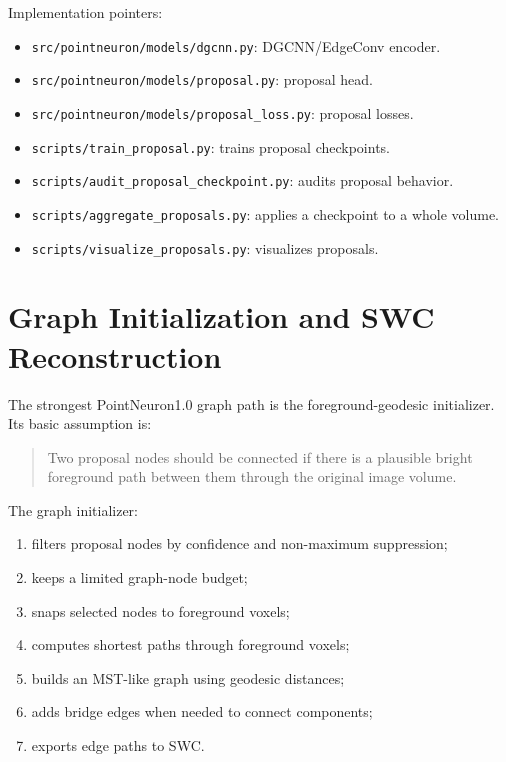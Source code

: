 \documentclass[11pt]{article}
\begin{document}
Implementation pointers:

\begin{itemize}
  \item \texttt{src/pointneuron/models/dgcnn.py}: DGCNN/EdgeConv encoder.
  \item \texttt{src/pointneuron/models/proposal.py}: proposal head.
  \item \texttt{src/pointneuron/models/proposal\_loss.py}: proposal losses.
  \item \texttt{scripts/train\_proposal.py}: trains proposal checkpoints.
  \item \texttt{scripts/audit\_proposal\_checkpoint.py}: audits proposal
  behavior.
  \item \texttt{scripts/aggregate\_proposals.py}: applies a checkpoint to a
  whole volume.
  \item \texttt{scripts/visualize\_proposals.py}: visualizes proposals.
\end{itemize}

\section{Graph Initialization and SWC Reconstruction}

The strongest PointNeuron1.0 graph path is the foreground-geodesic initializer.
Its basic assumption is:

\begin{quote}
Two proposal nodes should be connected if there is a plausible bright
foreground path between them through the original image volume.
\end{quote}

The graph initializer:

\begin{enumerate}
  \item filters proposal nodes by confidence and non-maximum suppression;
  \item keeps a limited graph-node budget;
  \item snaps selected nodes to foreground voxels;
  \item computes shortest paths through foreground voxels;
  \item builds an MST-like graph using geodesic distances;
  \item adds bridge edges when needed to connect components;
  \item exports edge paths to SWC.
\end{enumerate}
\end{document}
